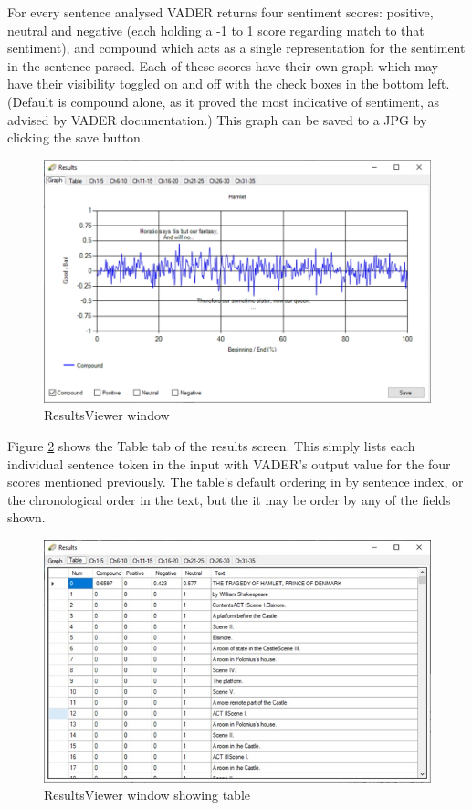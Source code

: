 \documentclass{article}
\begin{document}
        For every sentence analysed VADER returns four sentiment scores: positive, neutral and negative (each holding a -1 to 1 score regarding match to that sentiment), and compound which acts as a single representation for the sentiment in the sentence parsed. Each of these scores have their own graph which may have their visibility toggled on and off with the check boxes in the bottom left. (Default is compound alone, as it proved the most indicative of sentiment, as advised by VADER documentation.) This graph can be saved to a JPG by clicking the save button.
        \begin{figure}[htbp]
            \includegraphics[width=1\textwidth]{Figures/Misc/resultsviewer}
            \caption{ResultsViewer window}
            \label{fig:resultsviewer}
        \end{figure}
        Figure \ref{fig:resultstable} shows the Table tab of the results screen. This simply lists each individual sentence token in the input with VADER’s output value for the four scores mentioned previously. The table’s default ordering in by sentence index, or the chronological order in the text, but the it may be order by any of the fields shown.
        \begin{figure}[H]
            \includegraphics[width=1\textwidth]{Figures/Misc/resultstable}
            \caption{ResultsViewer window showing table}
            \label{fig:resultstable}
        \end{figure}
\end{document}
